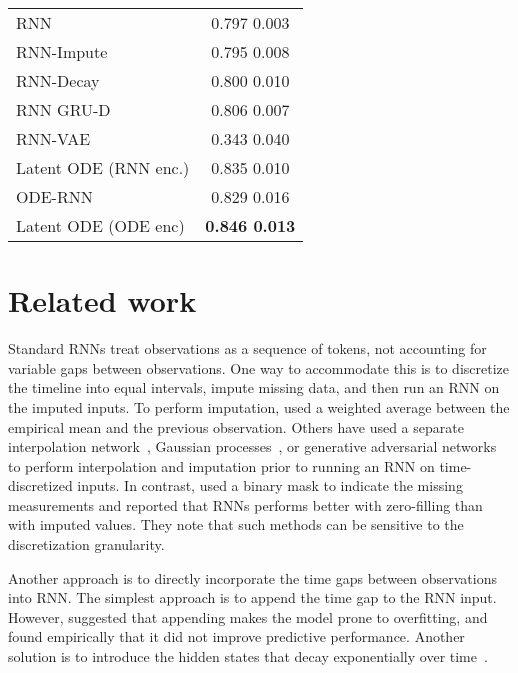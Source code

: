 \documentclass{article}
\begin{document}
\begin{table}
{\begin{tabular}{@{}lc@{}}
        \midrule
        RNN  &  0.797  0.003 \\
        RNN-Impute &  0.795  0.008 \\
        RNN-Decay  & 0.800  0.010 \\
        RNN GRU-D &  0.806  0.007 \\
        RNN-VAE &   0.343  0.040\\
        Latent ODE (RNN enc.) & 0.835  0.010 \\
        \addlinespace[2pt]
        \hdashline
        \addlinespace[2pt]
        ODE-RNN &  0.829  0.016 \\
        Latent ODE (ODE enc) &  \textbf{0.846  0.013} \\
        \bottomrule
        \end{tabular}
    }
    \vspace{-4mm}
\end{table}


\section{Related work}

Standard RNNs treat observations as a sequence of tokens, not accounting for variable gaps between observations.
One way to accommodate this is to discretize the timeline into equal intervals, impute missing data, and then run an RNN on the imputed inputs.
To perform imputation, \citet{che_sontag_2018} used a weighted average between the empirical mean and the previous observation.
Others have used a separate interpolation network~\citep{shukla2018interpolationprediction}, Gaussian processes~\citep{pmlrv70futoma17a}, or generative adversarial networks~\citep{gan_imputation} to perform interpolation and imputation prior to running an RNN on time-discretized inputs.
In contrast, \citet{pmlr_Lipton16} used a binary mask to indicate the missing measurements and reported that RNNs performs better with zero-filling than with imputed values.
They note that such methods can be sensitive to the discretization granularity.

Another approach is to directly incorporate the time gaps between observations into RNN.
The simplest approach is to append the time gap  to the RNN input. 
However, \citet{mozer_2017} suggested that appending  makes the model prone to overfitting, and found empirically that it did not improve predictive performance.
Another solution is to introduce the hidden states that decay exponentially over time~\citep{che_sontag_2018, BRITS_2018, google_ehr_2018}.
\end{document}
